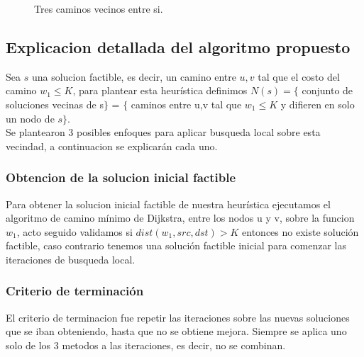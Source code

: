\begin{figure}[H]
\centering
{}
\caption{Tres caminos vecinos entre si.}
\end{figure}

\subsection{Explicacion detallada del algoritmo propuesto}
Sea $s$ una solucion factible, es decir, un camino entre $u,v$ tal que el costo del camino $w_1 \leq K$,
para plantear esta heur\'istica definimos $N(s) = \{ $ conjunto de soluciones vecinas de s$\}$ = $\{$ caminos entre u,v tal que $w_1 \leq K$ y difieren en solo un nodo de $s\}$.\\

Se plantearon 3 posibles enfoques para aplicar busqueda local sobre esta vecindad, a continuacion se explicar\'an cada uno.

\subsubsection{Obtencion de la solucion inicial factible}

Para obtener la solucion inicial factible de nuestra heur\'istica ejecutamos el algoritmo de camino m\'inimo de Dijkstra, entre los nodos u y v, sobre la funcion $w_1$, acto seguido validamos si $dist(w_1, src, dst) > K$ entonces no existe soluci\'on factible, caso contrario tenemos una soluci\'on factible inicial para comenzar las 
iteraciones de busqueda local.

\subsubsection{Criterio de terminaci\'on}
El criterio de terminacion fue repetir las iteraciones sobre las nuevas soluciones que se iban obteniendo, hasta que no se obtiene mejora.
Siempre se aplica uno solo de los 3 metodos a las iteraciones, es decir, no se combinan.

